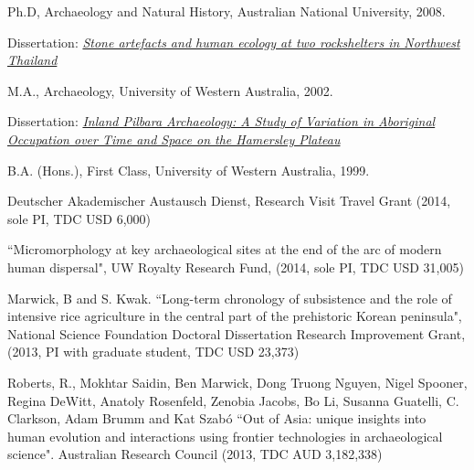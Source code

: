 \documentclass[11pt,article,oneside]{memoir}
\begin{document}


\ind Ph.D, Archaeology and Natural History, Australian National University, 2008.

 \vspace{0.05in}
\begin{Spacing}{0.75}
\ind \hspace{0.35in} 
\footnotesize {Dissertation: \emph{\href{http://dx.doi.org/10.6084/m9.figshare.765252}{Stone artefacts and human ecology at two rockshelters in Northwest Thailand}}} \normalsize \vspace{0.05in}
 \end{Spacing}

\ind M.A., Archaeology, University of Western Australia, 2002. 

\vspace{0.05in}
\begin{Spacing}{0.75} 
\ind \hspace{0.35in} \footnotesize Dissertation: \emph{\href{http://dx.doi.org/10.6084/m9.figshare.765251}{ Inland Pilbara Archaeology: A Study of Variation in Aboriginal Occupation over Time and Space on the Hamersley Plateau}} \normalsize \vspace{0.05in}
 \end{Spacing}

\ind B.A. (Hons.), First Class, University of Western Australia, 1999.

\bigskip


\medskip

\ind  Deutscher Akademischer Austausch Dienst, Research Visit Travel Grant (2014, sole PI, TDC USD 6,000)

\ind  ``Micromorphology at key archaeological sites at the end of the arc of modern human dispersal", UW Royalty Research Fund, (2014, sole PI, TDC USD 31,005)

\ind  Marwick, B and S. Kwak. ``Long-term chronology of subsistence and the role of intensive rice agriculture in the central part of the prehistoric Korean peninsula", National Science Foundation Doctoral Dissertation Research Improvement Grant, (2013,  PI with graduate student, TDC USD 23,373)

\ind  Roberts, R., Mokhtar Saidin, Ben Marwick, Dong Truong Nguyen, Nigel Spooner, Regina DeWitt, Anatoly Rosenfeld, Zenobia Jacobs, Bo Li, Susanna Guatelli, C. Clarkson, Adam Brumm and Kat Szabó ``Out of Asia: unique insights into human evolution and interactions using frontier technologies in archaeological science".  Australian Research Council (2013, TDC AUD 
3,182,338)
\end{document}
